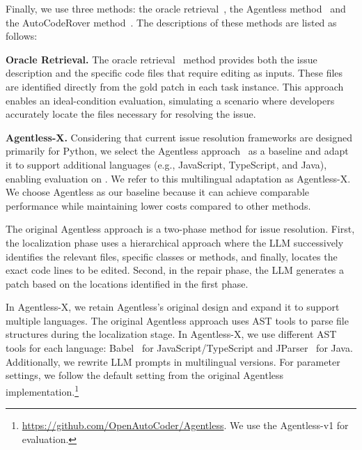 Finally, we use three methods: the oracle retrieval~\cite{jimenez2023swe,tao2024magis}, the Agentless method~\cite{xia2024agentless} and the AutoCodeRover method~\cite{zhang2024autocoderover}. The descriptions of these methods are listed as follows:

\textbf{Oracle Retrieval.} The oracle retrieval~\cite{tao2024magis,jimenez2023swe} method provides both the issue description and the specific code files that require editing as inputs. These files are identified directly from the gold patch in each task instance. This approach enables an ideal-condition evaluation, simulating a scenario where developers accurately locate the files necessary for resolving the issue.



\textbf{Agentless-X.} 
Considering that current issue resolution frameworks are designed primarily for Python, we select the Agentless approach~\cite{xia2024agentless} as a baseline and adapt it to support additional languages (e.g., JavaScript, TypeScript, and Java), enabling evaluation on \Swebenchx. We refer to this multilingual adaptation as Agentless-X. We choose Agentless as our baseline because it can achieve comparable performance while maintaining lower costs compared to other methods.

The original Agentless approach is a two-phase method for issue resolution. First, the localization phase uses a hierarchical approach where the LLM successively identifies the relevant files, specific classes or methods, and finally, locates the exact code lines to be edited. Second, in the  repair phase, the LLM generates a patch based on the locations identified in the first phase.

In Agentless-X, we retain Agentless's original design and expand it to support multiple languages. The original Agentless approach uses AST tools to parse file structures during the localization stage. In Agentless-X, we use different AST tools for each language: Babel~\cite{babel} for JavaScript/TypeScript and JParser~\cite{jparser} for Java. Additionally, we rewrite LLM prompts in multilingual versions. For parameter settings, we follow the default setting from the original Agentless implementation.\footnote{\url{https://github.com/OpenAutoCoder/Agentless}. We use the Agentless-v1 for evaluation.}


